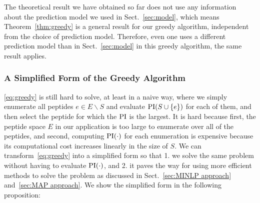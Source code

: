 \begin{remark*}
  The theoretical result we have obtained so far does not use any information about the prediction model we used in Sect.~\ref{sec:model}, 
  which means Theorem~\ref{thm:greedy} is a general result for our greedy algorithm, independent from the choice of prediction model.
  Therefore, even one uses a different prediction model than in Sect.~\ref{sec:model} in this greedy algorithm, the same result applies.
\end{remark*}

\subsubsection{A Simplified Form of the Greedy Algorithm} \label{sec:reduced form}
\eqref{eq:greedy} is still hard to solve, at least in a naive way, where we simply enumerate all peptides $e \in E \backslash S$ 
and evaluate $\text{PI} (S \cup \{e\})$ for each of them, and then select the peptide for which the $\text{PI}$ is the largest. It is hard because
first, the peptide space $E$ in our application is too large to enumerate over all of the peptides, and second, computing $\text{PI}(\cdot)$
for each enumeration is expensive because its computational cost increases linearly in the size of $S$. We can transform~\eqref{eq:greedy}
into a simplified form so that 1. we solve the same problem without having to evaluate $\text{PI}(\cdot)$, and 2. it paves the way for using
more efficient methods to solve the problem as discussed in Sect.~\ref{sec:MINLP approach} and~\ref{sec:MAP approach}. We show the 
simplified form in the following proposition:

